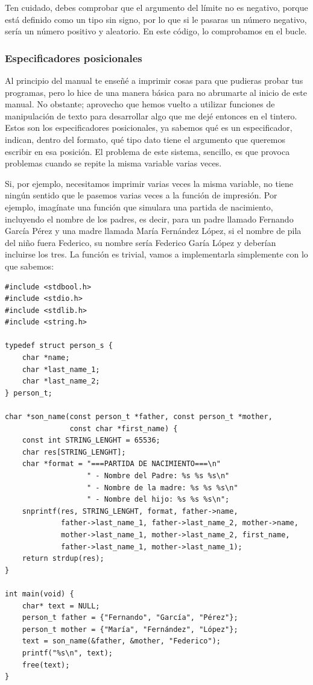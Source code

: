 \documentclass[a4paper]{article}
\begin{document}
Ten cuidado, debes comprobar que el argumento del límite no es negativo,
porque está definido como un tipo sin signo, por lo que si le pasaras un número
negativo, sería un número positivo y aleatorio. En este código, lo comprobamos
en el bucle.

\subsubsection{Especificadores posicionales}
Al principio del manual te enseñé a imprimir cosas para que pudieras probar
tus programas, pero lo hice de una manera básica para no abrumarte al inicio
de este manual. No obstante; aprovecho que hemos vuelto a utilizar funciones
de manipulación de texto para desarrollar algo que me dejé entonces en el
tintero. Estos son los especificadores posicionales, ya sabemos qué es un
especificador, indican, dentro del formato, qué tipo dato tiene el argumento
que queremos escribir en esa posición. El problema de este sistema, sencillo,
es que provoca problemas cuando se repite la misma variable varias veces.

Si, por ejemplo, necesitamos imprimir varias veces la misma variable, no
tiene ningún sentido que le pasemos varias veces a la función de impresión.
Por ejemplo, imagínate una función que simulara una partida de nacimiento,
incluyendo el nombre de los padres, es decir, para un padre
llamado Fernando García Pérez y una madre llamada María Fernández López,
si el nombre de pila del niño fuera
Federico, su nombre sería Federico Garía López y deberían incluirse los tres.
La función es trivial, vamos a implementarla simplemente con lo que sabemos:


\noindent
\begin{minipage}[H]{\linewidth}
\mbox{}
\begin{lstlisting}[style=C,
caption={Ejemplo de impresión con argumento repetido},
label={lst:repeatedMessages}]
#include <stdbool.h>
#include <stdio.h>
#include <stdlib.h>
#include <string.h>

typedef struct person_s {
    char *name;
    char *last_name_1;
    char *last_name_2;
} person_t;

char *son_name(const person_t *father, const person_t *mother,
               const char *first_name) {
    const int STRING_LENGHT = 65536;
    char res[STRING_LENGHT];
    char *format = "===PARTIDA DE NACIMIENTO===\n"
                   " - Nombre del Padre: %s %s %s\n"
                   " - Nombre de la madre: %s %s %s\n"
                   " - Nombre del hijo: %s %s %s\n";
    snprintf(res, STRING_LENGHT, format, father->name,
             father->last_name_1, father->last_name_2, mother->name,
             mother->last_name_1, mother->last_name_2, first_name,
             father->last_name_1, mother->last_name_1);
    return strdup(res);
}

int main(void) {
    char* text = NULL;
    person_t father = {"Fernando", "García", "Pérez"};
    person_t mother = {"María", "Fernández", "López"};
    text = son_name(&father, &mother, "Federico");
    printf("%s\n", text);
    free(text);
}
\end{lstlisting}
\end{minipage}
\end{document}
